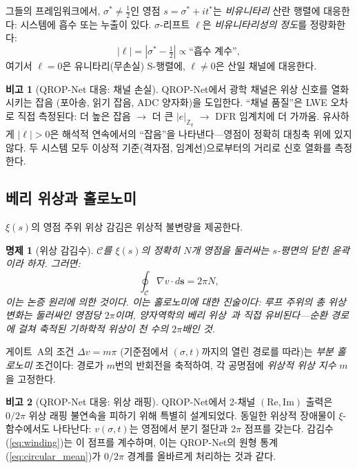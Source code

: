 \documentclass[11pt, a4paper]{article}
\theoremstyle{definition}
\newtheorem{remark}{비고}[section]
\theoremstyle{plain}
\newtheorem{proposition}[theorem]{명제}
\newcommand{\Zq}{\mathbb{Z}_q}
\newcommand{\xif}{\xi}
\begin{document}
그들의 프레임워크에서, $\sigma^* \neq \tfrac{1}{2}$인 영점 $s = \sigma^* + it^*$는 \textit{비유니타리} 산란 행렬에 대응한다: 시스템에 흡수 또는 누출이 있다. $\sigma$-리프트 $\ell$은 \textit{비유니타리성의 정도}를 정량화한다:
\begin{equation}
  |\ell| = |\sigma^* - \tfrac{1}{2}| \propto
  \text{``흡수 계수''},
  \label{eq:non_unitarity}
\end{equation}
여기서 $\ell = 0$은 유니타리(무손실) S-행렬에, $\ell \neq 0$은 산일 채널에 대응한다.

\begin{remark}[QROP-Net 대응: 채널 손실]
\label{rem:unitarity}
QROP-Net에서 광학 채널은 위상 신호를 열화시키는 잡음 (포아송, 읽기 잡음, ADC 양자화)을 도입한다. ``채널 품질''은 LWE 오차로 직접 측정된다: 더 높은 잡음 $\to$ 더 큰 $|e|_{\Zq}$ $\to$ DFR 임계치에 더 가까움. 유사하게 $|\ell| > 0$은 해석적 연속에서의 ``잡음''을 나타낸다---영점이 정확히 대칭축 위에 있지 않다. 두 시스템 모두 이상적 기준(격자점, 임계선)으로부터의 거리로 신호 열화를 측정한다.
\end{remark}


\subsection{베리 위상과 홀로노미}
\label{sec:berry}

$\xif(s)$의 영점 주위 위상 감김은 위상적 불변량을 제공한다.

\begin{proposition}[위상 감김수]
\label{prop:winding}
$\mathcal{C}$를 $\xif(s)$의 정확히 $N$개 영점을 둘러싸는 $s$-평면의 닫힌 윤곽이라 하자. 그러면:
\begin{equation}
  \oint_{\mathcal{C}} \nabla v \cdot d\mathbf{s} = 2\pi N,
  \label{eq:winding}
\end{equation}
이는 논증 원리에 의한 것이다. 이는 \textit{홀로노미}에 대한 진술이다: 루프 주위의 총 위상 변화는 둘러싸인 영점당 $2\pi$이며, 양자역학의 베리 위상~\cite{berry1984}과 직접 유비된다---순환 경로에 걸쳐 축적된 기하학적 위상이 천 수의 $2\pi$배인 것.
\end{proposition}

게이트~A의 조건 $\Delta v = m\pi$ (기준점에서 $(\sigma, t)$까지의 열린 경로를 따라)는 \textit{부분 홀로노미} 조건이다: 경로가 $m$번의 반회전을 축적하여, 각 공명점에 \textit{위상적 위상 지수} $m$을 고정한다.

\begin{remark}[QROP-Net 대응: 위상 래핑]
\label{rem:phase_wrapping}
QROP-Net에서 2-채널 $(\mathrm{Re}, \mathrm{Im})$ 출력은 $0/2\pi$ 위상 래핑 불연속을 피하기 위해 특별히 설계되었다. 동일한 위상적 장애물이 $\xif$-함수에서도 나타난다: $v(\sigma,t)$는 영점에서 분기 절단과 $2\pi$ 점프를 갖는다. 감김수 (\cref{eq:winding})는 이 점프를 계수하며, 이는 QROP-Net의 원형 통계 (\cref{eq:circular_mean})가 $0/2\pi$ 경계를 올바르게 처리하는 것과 같다.
\end{remark}
\end{document}
